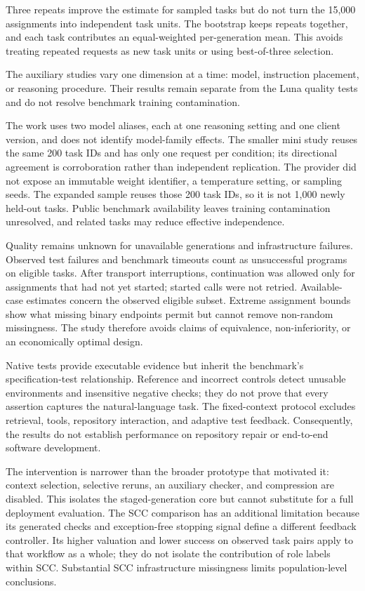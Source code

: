 \documentclass[pdflatex,sn-nature]{scientificreports}
\begin{document}
Three repeats improve the estimate for sampled tasks but do not turn the 15,000 assignments into independent task units. The bootstrap keeps repeats together, and each task contributes an equal-weighted per-generation mean. This avoids treating repeated requests as new task units or using best-of-three selection.

The auxiliary studies vary one dimension at a time: model, instruction placement, or reasoning procedure. Their results remain separate from the Luna quality tests and do not resolve benchmark training contamination.



The work uses two model aliases, each at one reasoning setting and one client version, and does not identify model-family effects. The smaller mini study reuses the same 200 task IDs and has only one request per condition; its directional agreement is corroboration rather than independent replication. The provider did not expose an immutable weight identifier, a temperature setting, or sampling seeds. The expanded sample reuses those 200 task IDs, so it is not 1,000 newly held-out tasks. Public benchmark availability leaves training contamination unresolved, and related tasks may reduce effective independence.

Quality remains unknown for unavailable generations and infrastructure failures. Observed test failures and benchmark timeouts count as unsuccessful programs on eligible tasks. After transport interruptions, continuation was allowed only for assignments that had not yet started; started calls were not retried. Available-case estimates concern the observed eligible subset. Extreme assignment bounds show what missing binary endpoints permit but cannot remove non-random missingness. The study therefore avoids claims of equivalence, non-inferiority, or an economically optimal design.

Native tests provide executable evidence but inherit the benchmark's specification-test relationship. Reference and incorrect controls detect unusable environments and insensitive negative checks; they do not prove that every assertion captures the natural-language task. The fixed-context protocol excludes retrieval, tools, repository interaction, and adaptive test feedback. Consequently, the results do not establish performance on repository repair or end-to-end software development.

The intervention is narrower than the broader prototype that motivated it: context selection, selective reruns, an auxiliary checker, and compression are disabled. This isolates the staged-generation core but cannot substitute for a full deployment evaluation. The SCC comparison has an additional limitation because its generated checks and exception-free stopping signal define a different feedback controller. Its higher valuation and lower success on observed task pairs apply to that workflow as a whole; they do not isolate the contribution of role labels within SCC. Substantial SCC infrastructure missingness limits population-level conclusions.
\end{document}
